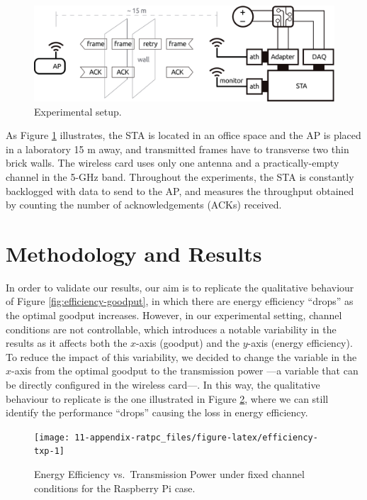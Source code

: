 \documentclass[twoside,nohyper]{tufte-book}
\theoremstyle{definition}
\theoremstyle{definition}
\theoremstyle{definition}
\theoremstyle{remark}
\begin{document}
\begin{figure}

{\centering \includegraphics{img/06/testbed} 

}

\caption[Experimental setup.]{Experimental setup.}\label{fig:testbedexp}
\end{figure}

As Figure \ref{fig:testbedexp} illustrates, the STA is located in an
office space and the AP is placed in a laboratory 15 m away, and
transmitted frames have to transverse two thin brick walls. The wireless
card uses only one antenna and a practically-empty channel in the 5-GHz
band. Throughout the experiments, the STA is constantly backlogged with
data to send to the AP, and measures the throughput obtained by counting
the number of acknowledgements (ACKs) received.

\section{Methodology and Results}\label{methodology-and-results}

In order to validate our results, our aim is to replicate the
qualitative behaviour of Figure \ref{fig:efficiency-goodput}, in which
there are energy efficiency ``drops'' as the optimal goodput increases.
However, in our experimental setting, channel conditions are not
controllable, which introduces a notable variability in the results as
it affects both the \(x\)-axis (goodput) and the \(y\)-axis (energy
efficiency). To reduce the impact of this variability, we decided to
change the variable in the \(x\)-axis from the optimal goodput to the
transmission power ---a variable that can be directly configured in the
wireless card---. In this way, the qualitative behaviour to replicate is
the one illustrated in Figure \ref{fig:efficiency-txp}, where we can
still identify the performance ``drops'' causing the loss in energy
efficiency.




\begin{figure}

{\centering \texttt{[image: 11-appendix-ratpc\_files/figure-latex/efficiency-txp-1]} 

}

\caption[Energy Efficiency vs.~Transmission Power under
fixed channel conditions for the Raspberry Pi case.]{Energy Efficiency vs.~Transmission Power under
fixed channel conditions for the Raspberry Pi case.}\label{fig:efficiency-txp}
\end{figure}
\end{document}
